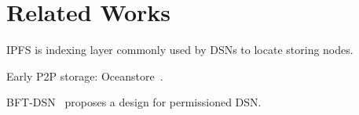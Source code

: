 \section{Related Works}
\label{sec:rel}

IPFS is indexing layer commonly used by DSNs to locate storing nodes.

Early P2P storage: Oceanstore~\cite{oceanstore}.

BFT-DSN~\cite{bft-dsn} proposes a design for permissioned DSN.